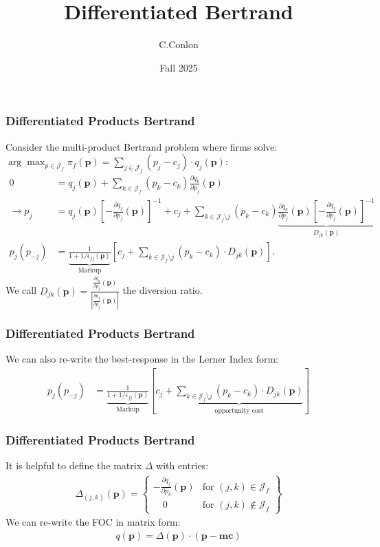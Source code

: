 

\title{Differentiated Bertrand}
\author{C.Conlon}
\date{Fall 2025}


\frame{\titlepage}

\begin{frame}
\frametitle{Differentiated Products Bertrand}
\small
Consider the multi-product Bertrand problem where firms solve: $\arg \max_{p \in \mathcal{J}_f} \pi_f (\mathbf{p}) = \sum_{j \in \mathcal{J}_f} (p_j - c_j) \cdot q_j(\mathbf{p})$:
\begin{align*}
 0&= q_j(\mathbf{p}) + \sum_{k \in \mathcal{J}_f} (p_k - c_k) \frac{\partial q_{k}}{\partial p_j}(\mathbf{p}) \\
\rightarrow p_j &=q_{j}(\mathbf{p}) \left[-\frac{\partial q_{j}}{\partial p_{j}}(\mathbf{p})\right]^{-1} + c_{j} + \sum_{k \in \mathcal{J}_{f} \setminus j} \left(p_{k}-c_{k}\right) \underbrace{\frac{\partial q_{k}}{\partial p_{j}}(\mathbf{p})\left[-\frac{\partial q_{j}}{\partial p_{j}}(\mathbf{p})\right]^{-1}}_{D_{jk}(\mathbf{p})}\\
p_j(p_{-j}) &= \underbrace{\frac{1}{1+1/\epsilon_{jj}(\mathbf{p})}}_{\text{Markup}} \left[ c_j + \sum_{k \in \mathcal{J}_{f} \setminus j}  (p_k-c_k) \cdot  D_{jk} (\mathbf{p}) \right].
\end{align*}
We call $D_{jk}(\mathbf{p}) = \frac{\frac{\partial q_{k}}{\partial p_j}(\mathbf{p})}{\left| \frac{\partial q_{j}}{\partial p_j}(\mathbf{p}) \right|}$ the \alert{diversion ratio}.
\end{frame}

\begin{frame}
\frametitle{Differentiated Products Bertrand}
We can also re-write the best-response in the Lerner Index form:
\begin{align*}
p_j(p_{-j}) &= \underbrace{\frac{1}{1+1/\epsilon_{jj}(\mathbf{p})}}_{\text{Markup}} \left[c_j + \underbrace{\sum_{k \in \mathcal{J}_{f} \setminus j}  (p_k-c_k) \cdot  D_{jk} (\mathbf{p}) }_{\text{opportunity cost}}\right]
\end{align*}

\end{frame}


\begin{frame}
\frametitle{Differentiated Products Bertrand}
It is helpful to define the matrix $\Delta$ with entries:
\begin{eqnarray*}
\Delta_{(j,k)}(\mathbf{p}) = \left\{\begin{array}{lr}
         - \frac{\partial q_{j}}{\partial p_k}(\mathbf{p}) & \text{for }  (j,k) \in \mathcal{J}_f\\
       	  \quad 0 & \text{for } (j,k) \notin \mathcal{J}_f
        \end{array} \right\}
\end{eqnarray*}
We can re-write the FOC in matrix form:
\begin{eqnarray*}
q(\mathbf{p}) = \Delta(\mathbf{p})\cdot(\mathbf{p}-\mathbf{mc})
\end{eqnarray*}
\end{frame}


